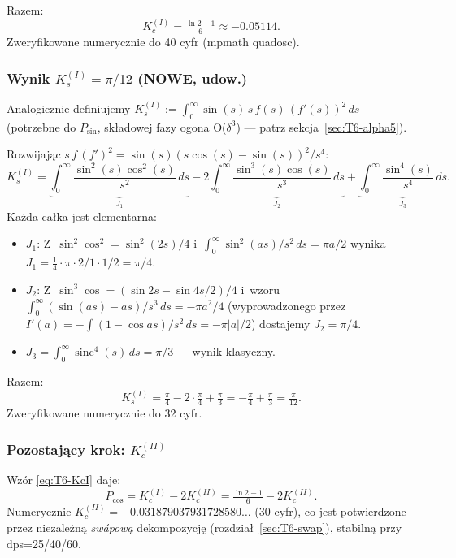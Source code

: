 Razem:
\begin{equation}
  \boxed{\;K_c^{(I)} = \tfrac{\ln 2 - 1}{6} \approx -0.05114.\;}
  \label{eq:T6-KcI}
\end{equation}
Zweryfikowane numerycznie do 40 cyfr (mpmath quadosc).

\subsubsection*{Wynik $K_s^{(I)} = \pi/12$ \textbf{(NOWE, udow.)}}

Analogicznie definiujemy $K_s^{(I)} := \int_0^\infty \sin(s)\,s\,f(s)\,(f'(s))^2\,ds$
(potrzebne do $P_{\sin}$, sk\l{}adowej fazy ogona O($\delta^3$) --- patrz
sekcja~\ref{sec:T6-alpha5}).

Rozwijaj\k{a}c $s\,f\,(f')^2 = \sin(s)(s\cos(s)-\sin(s))^2/s^4$:
\begin{equation}
  K_s^{(I)} = \underbrace{\int_0^\infty \frac{\sin^2(s)\cos^2(s)}{s^2}\,ds}_{J_1}
            - 2\underbrace{\int_0^\infty \frac{\sin^3(s)\cos(s)}{s^3}\,ds}_{J_2}
            + \underbrace{\int_0^\infty \frac{\sin^4(s)}{s^4}\,ds}_{J_3}.
\end{equation}
Ka\.zda ca\l{}ka jest elementarna:
\begin{itemize}
  \item $J_1$: Z~$\sin^2\cos^2 = \sin^2(2s)/4$ i~$\int_0^\infty \sin^2(as)/s^2\,ds = \pi a/2$
        wynika $J_1 = \tfrac{1}{4}\cdot \pi\cdot 2/1 \cdot 1/2 = \pi/4$.
  \item $J_2$: Z~$\sin^3\cos = (\sin 2s - \sin 4s/2)/4$
        i~wzoru $\int_0^\infty (\sin(as)-as)/s^3\,ds = -\pi a^2/4$
        (wyprowadzonego przez $I'(a) = -\int (1-\cos as)/s^2\,ds = -\pi|a|/2$)
        dostajemy $J_2 = \pi/4$.
  \item $J_3 = \int_0^\infty \operatorname{sinc}^4(s)\,ds = \pi/3$ --- wynik klasyczny.
\end{itemize}
Razem:
\begin{equation}
  \boxed{\;K_s^{(I)} = \tfrac{\pi}{4} - 2\cdot\tfrac{\pi}{4} + \tfrac{\pi}{3}
          = -\tfrac{\pi}{4} + \tfrac{\pi}{3} = \tfrac{\pi}{12}.\;}
  \label{eq:T6-KsI}
\end{equation}
Zweryfikowane numerycznie do 32 cyfr.

\subsubsection*{Pozostaj\k{a}cy krok: $K_c^{(II)}$}

Wz\'or \eqref{eq:T6-KcI} daje:
\begin{equation}
  P_{\cos} = K_c^{(I)} - 2 K_c^{(II)} = \tfrac{\ln 2 - 1}{6} - 2 K_c^{(II)}.
\end{equation}
Numerycznie $K_c^{(II)} = -0.031879037931728580\ldots$ (30 cyfr), co jest
potwierdzone przez niezale\.zn\k{a} \emph{sw\'apow\k{a}} dekompozycj\k{e}
(rozdzia\l{}~\ref{sec:T6-swap}), stabiln\k{a} przy dps=25/40/60.

